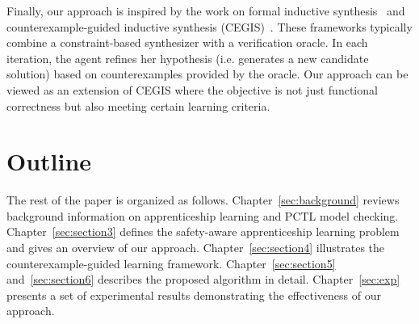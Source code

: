 Finally, our approach is inspired by the work on formal inductive synthesis~\cite{jha-ai2017} and counterexample-guided inductive synthesis (CEGIS)~\cite{CEGIS}. These frameworks typically combine a constraint-based synthesizer with a verification oracle. In each iteration, the agent refines her hypothesis (i.e. generates a new candidate solution) based on counterexamples provided by the oracle. Our approach can be viewed as an extension of CEGIS where the objective is not just functional correctness but also meeting certain learning criteria. 

\section{Outline}
The rest of the paper is organized as follows. 
Chapter~\ref{sec:background} reviews background information on apprenticeship learning and PCTL model checking. 
Chapter~\ref{sec:section3} defines the safety-aware apprenticeship learning problem and gives an overview of our approach. 
Chapter~\ref{sec:section4} illustrates the counterexample-guided learning framework. 
Chapter~\ref{sec:section5} and~\ref{sec:section6} describes the proposed algorithm in detail. 
Chapter~\ref{sec:exp} presents a set of experimental results demonstrating the effectiveness of our approach. 

